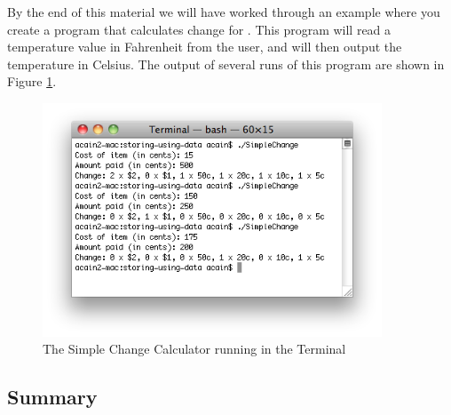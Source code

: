 \clearpage

By the end of this material we will have worked through an example where you create a program that calculates change for . This program will read a temperature value in Fahrenheit from the user, and will then output the temperature in Celsius. The output of several runs of this program are shown in Figure \ref{fig:storing-using-simeple-change}.

\begin{figure}[h]
   \centering
   \includegraphics[width=0.9\textwidth]{./topics/storing-using-data/images/SimpleChange} 
   \caption{The Simple Change Calculator running in the Terminal}
   \label{fig:storing-using-simeple-change}
\end{figure}















\clearpage
\subsection{Summary} %
\label{sub:data_concepts_summary}


